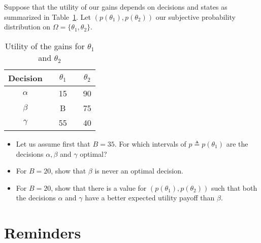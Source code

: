 \documentclass{../ape}
\begin{document}
\section{}
Suppose that the utility of our gains depends on decisions and states as summarized in Table~\ref{ex7}. Let $(p(\theta_1), p(\theta_2))$ our subjective probability distribution on $\Omega = \{ \theta_1, \theta_2 \}$.
\begin{table}[h!]
	\begin{center}
		\begin{tabular}{ccccc}
			\hline
			Decision & & $\theta_1$ & & $\theta_2$ \\
			\hline
			$\alpha$ & & 15 & & 90 \\
			$\beta$ & & B & & 75 \\
			$\gamma$ & & 55 & & 40 \\
			\hline
		\end{tabular}
		\caption{Utility of the gains for $\theta_1$ and $\theta_2$} \label{ex7}
	\end{center}
\end{table}
\begin{itemize}
	\item Let us assume first that $B = 35$. For which intervals of $p \triangleq p(\theta_1)$ are the decisions $\alpha, \beta$ and $\gamma$ optimal? %
	\item For $B = 20$, show that $\beta$ is never an optimal decision.
	\item For $B = 20$, show that there is a value for $(p(\theta_1), p(\theta_2))$ such that  both the decisions $\alpha$ and $\gamma$ have a better expected utility payoff than  $\beta$.
\end{itemize}
\begin{solution}

\end{solution}
\section*{Reminders}
\end{document}
